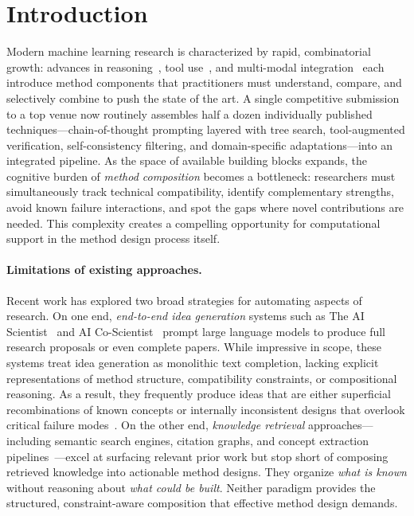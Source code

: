 \section{Introduction}
\label{sec:intro}

Modern machine learning research is characterized by rapid, combinatorial
growth: advances in reasoning~\cite{wei2022chain, yao2023tree}, tool
use~\cite{schick2023toolformer, qin2023toolllm}, and multi-modal
integration~\cite{shen2023hugginggpt, lu2023chameleon} each introduce method
components that practitioners must understand, compare, and selectively combine
to push the state of the art. A single competitive submission to a top venue
now routinely assembles half a dozen individually published techniques---chain-of-thought prompting layered with tree search, tool-augmented verification,
self-consistency filtering, and domain-specific adaptations---into an
integrated pipeline. As the space of available building blocks expands, the
cognitive burden of \emph{method composition} becomes a bottleneck: researchers
must simultaneously track technical compatibility, identify complementary
strengths, avoid known failure interactions, and spot the gaps where novel
contributions are needed. This complexity creates a compelling opportunity for
computational support in the method design process itself.

\paragraph{Limitations of existing approaches.}
Recent work has explored two broad strategies for automating aspects of
research. On one end, \emph{end-to-end idea generation} systems such as The AI
Scientist~\cite{lu2024aiscientist} and AI Co-Scientist~\cite{gottifredi2024aicoscientist} prompt large language models to
produce full research proposals or even complete papers. While impressive in
scope, these systems treat idea generation as monolithic text completion,
lacking explicit representations of method structure, compatibility
constraints, or compositional reasoning. As a result, they frequently produce
ideas that are either superficial recombinations of known concepts or
internally inconsistent designs that overlook critical failure
modes~\cite{huang2024mlrbench}. On the other end, \emph{knowledge retrieval}
approaches---including semantic search engines, citation graphs, and concept
extraction pipelines~\cite{baek2024researchagent, li2024chainofideas}---excel
at surfacing relevant prior work but stop short of composing retrieved
knowledge into actionable method designs. They organize \emph{what is known}
without reasoning about \emph{what could be built}. Neither paradigm provides
the structured, constraint-aware composition that effective method design
demands.

